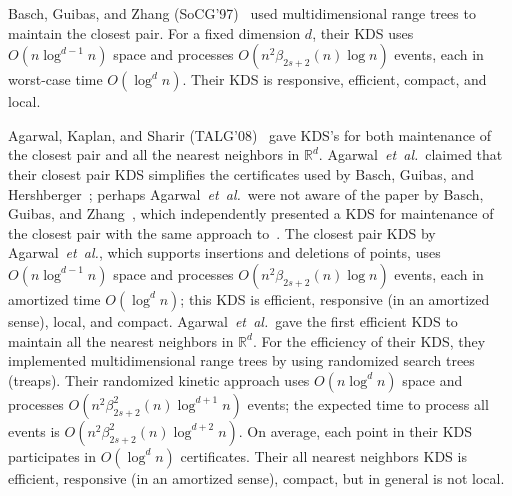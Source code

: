 \documentclass[11pt]{llncs}
\newcommand{\etal}{\emph{et~al.}}
\begin{document}
Basch, Guibas, and Zhang (SoCG'97)~\cite{Basch:1997:PPM:262839.262998} used multidimensional range trees to maintain the closest pair. For a fixed dimension $d$, their KDS uses $O(n\log^{d-1}n)$ space and processes $O(n^2\beta_{2s+2}(n)\log n)$ events, each in worst-case time $O(\log^d n)$. Their KDS is responsive, efficient, compact, and local.

Agarwal, Kaplan, and Sharir (TALG'08)~\cite{Agarwal:2008:KDD:1435375.1435379} gave KDS's for both maintenance of the closest pair and all the nearest neighbors in $\mathbb{R}^d$. Agarwal~\etal~claimed that their closest pair KDS simplifies the certificates used by Basch, Guibas, and Hershberger~\cite{Basch:1997:DSM:314161.314435}; perhaps Agarwal~\etal~were not aware of the paper by Basch, Guibas, and Zhang~\cite{Basch:1997:PPM:262839.262998}, which independently presented a KDS for maintenance of the closest pair with the same approach to~\cite{Basch:1997:PPM:262839.262998}. The closest pair KDS by Agarwal~\etal, which supports insertions and deletions of points, uses $O(n\log^{d-1} n)$ space and processes $O(n^2\beta_{2s+2}(n)\log n)$ events, each in amortized time $O(\log^d n)$; this KDS is efficient, responsive (in an amortized sense), local, and compact. 
Agarwal~\etal~gave the first efficient KDS to maintain all the nearest neighbors in $\mathbb{R}^d$. For the efficiency of their KDS, they implemented multidimensional range trees by using randomized search trees (treaps). Their randomized kinetic approach uses $O(n\log^d n)$ space and processes $O(n^2\beta_{2s+2}^2(n)\log^{d+1} n)$ events; the expected time to process all events is $O(n^2\beta_{2s+2}^2(n)\log^{d+2} n)$. On average, each point in their KDS participates in $O(\log^d n)$ certificates. Their all nearest neighbors KDS is efficient, responsive (in an amortized sense), compact, but in general is not local. 
\end{document}
